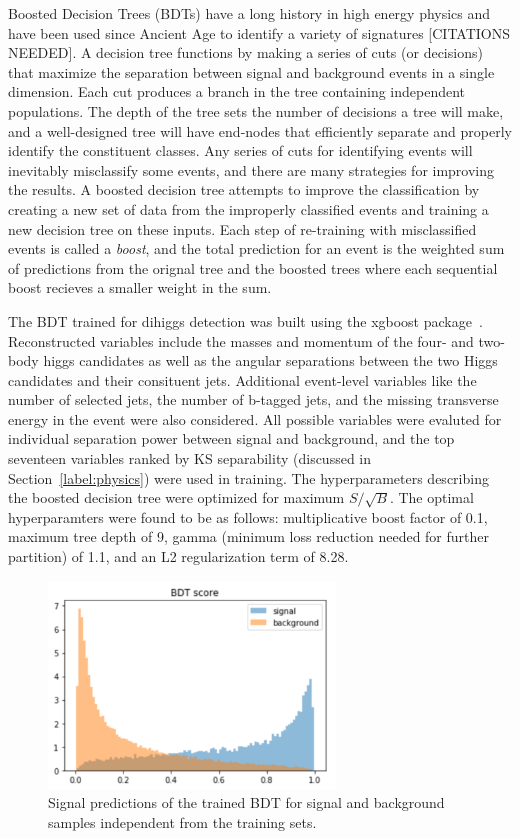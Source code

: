 \label{sec:BDT}
Boosted Decision Trees (BDTs) have a long history in high energy physics and have been used since Ancient Age to identify a variety of signatures [CITATIONS NEEDED]. A decision tree functions by making a series of cuts (or decisions) that maximize the separation between signal and background events in a single dimension. Each cut produces a branch in the tree containing independent populations. The depth of the tree sets the number of decisions a tree will make, and a well-designed tree will have end-nodes that efficiently separate and properly identify the constituent classes. Any series of cuts for identifying events will inevitably misclassify some events, and there are many strategies for improving the results. A boosted decision tree attempts to improve the classification by creating a new set of data from the improperly classified events and training a new decision tree on these inputs. Each step of re-training with misclassified events is called a \textit{boost}, and the total prediction for an event is the weighted sum of predictions from the orignal tree and the boosted trees where each sequential boost recieves a smaller weight in the sum.

The BDT trained for dihiggs detection was built using the xgboost package~\cite{xgboost}. Reconstructed variables include the masses and momentum of the four- and two-body higgs candidates as well as the angular separations between the two Higgs candidates and their consituent jets. Additional event-level variables like the number of selected jets, the number of b-tagged jets, and the missing transverse energy in the event were also considered. All possible variables were evaluted for individual separation power between signal and background, and the top seventeen variables ranked by KS separability (discussed in Section~\ref{label:physics}) were used in training. The hyperparameters describing the boosted decision tree were optimized for maximum $S/\sqrt{B}$. The optimal hyperparamters were found to be as follows: multiplicative boost factor of 0.1, maximum tree depth of 9, gamma (minimum loss reduction needed for further partition) of 1.1, and an L2 regularization term of 8.28.

\begin{figure}[!h]
\begin{center}
\includegraphics[width=3in]{BDT/bdt_pred}
\caption{Signal predictions of the trained BDT for signal and background samples independent from the training sets.}
\label{fig:bdt_pred}
\end{center}
\end{figure}

